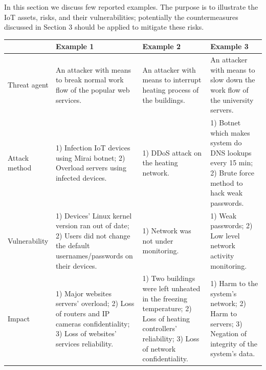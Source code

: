\documentclass[12pt]{article}
\begin{document}
In this section we discuss few reported examples. The purpose is to illustrate the IoT assets, risks, and their vulnerabilities; potentially the countermeasures discussed in Section 3 should be applied to mitigate these risks.


\begin{adjustbox}{angle=90}
	\begin{tabular}{ | l | p{5cm} | p{5cm} | p{5cm} |}
		\hline
		& Example 1 ~\cite{Ex1} & Example 2 ~\cite{Ex2} & Example 3 ~\cite{Ex3} \\ \hline
		Threat agent &  An attacker with means to break normal work flow of the popular web services.
		& 
		An attacker with means to interrupt heating process of the buildings. 
		& 
		An attacker with means to slow down the work flow of the university servers.  \\  \hline
		Attack method & 1)  Infection IoT devices using Mirai botnet;
		2) Overload servers using infected devices.
		& 
		1) DDoS attack on the heating network.
		& 
		1) Botnet which makes system do DNS lookups every 15 min;
		2) Brute force method to hack weak passwords.  \\ \hline
		Vulnerability &  1) Devices' Linux kernel version ran out of date;
		2) Users did not change the default usernames/passwords on their devices.
		& 
		1) Network was not under monitoring.
		& 
		1) Weak passwords;
		2) Low level network activity monitoring.  \\ \hline
		Impact & 1) Major websites servers' overload;
		2) Loss of routers and IP cameras confidentiality;
		3) Loss of websites' services reliability.  
		& 
		1) Two buildings were left unheated in the freezing temperature;
		2) Loss of heating controllers' reliability;
		3) Loss of network confidentiality.
		& 
		1) Harm to the system's network;
		2) Harm to servers;
		3) Negation of integrity of the system's data. \\ \hline
	\end{tabular}
\end{adjustbox}

\newpage
\end{document}
